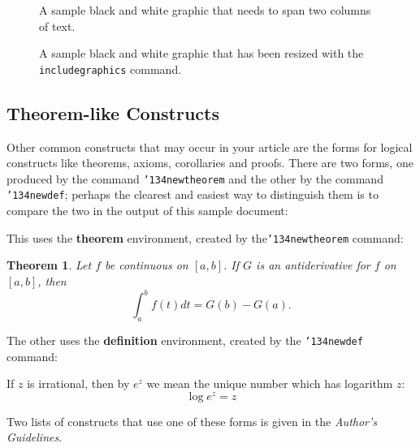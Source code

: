 \documentclass{sig-alternate-05-2015}
\begin{document}
\begin{figure*}
\centering
\caption{A sample black and white graphic
that needs to span two columns of text.}
\end{figure*}


\begin{figure}
\centering
\caption{A sample black and white graphic that has
been resized with the \texttt{includegraphics} command.}
\vskip -6pt
\end{figure}

\subsection{Theorem-like Constructs}
Other common constructs that may occur in your article are
the forms for logical constructs like theorems, axioms,
corollaries and proofs.  There are
two forms, one produced by the
command \texttt{{\char'134}newtheorem} and the
other by the command \texttt{{\char'134}newdef}; perhaps
the clearest and easiest way to distinguish them is
to compare the two in the output of this sample document:

This uses the \textbf{theorem} environment, created by
the\linebreak\texttt{{\char'134}newtheorem} command:
\newtheorem{theorem}{Theorem}
\begin{theorem}
Let $f$ be continuous on $[a,b]$.  If $G$ is
an antiderivative for $f$ on $[a,b]$, then
\begin{displaymath}\int^b_af(t)dt = G(b) - G(a).\end{displaymath}
\end{theorem}

The other uses the \textbf{definition} environment, created
by the \texttt{{\char'134}newdef} command:
\begin{definition}
If $z$ is irrational, then by $e^z$ we mean the
unique number which has
logarithm $z$: \begin{displaymath}{\log e^z = z}\end{displaymath}
\end{definition}

Two lists of constructs that use one of these
forms is given in the
\textit{Author's  Guidelines}.
 
\end{document}
